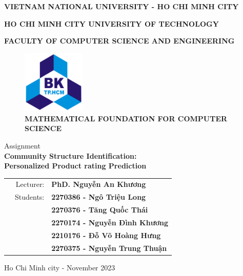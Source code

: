 \begin{titlepage}
\centerline{\bf \normalsize VIETNAM NATIONAL UNIVERSITY - HO CHI MINH CITY}
\centerline{\bf \normalsize HO CHI MINH CITY UNIVERSITY OF TECHNOLOGY}
\centerline{\bf \normalsize FACULTY OF COMPUTER SCIENCE AND ENGINEERING}
\vspace*{1cm}
\begin{figure}[h!]
	\begin{center}
		\includegraphics[width=3cm]{image/bku.png}
		\\
		\vspace{.5cm}
		\LARGE \textbf{MATHEMATICAL FOUNDATION FOR COMPUTER SCIENCE}
	\end{center}
\end{figure}

\begin{center}
    \Large Assignment
    \\
    \LARGE \textbf{Community Structure Identification:\\Personalized Product rating Prediction} \\
\end{center}

\vspace{3em}

\begin{table}[h]
\begin{tabular}{rrl}
\hspace{2.5 cm} & Lecturer: & \bf PhD. Nguyễn An Khương\\
& Students:  & \bf 2270386 - Ngô Triệu Long\\
& & \bf 2270376 - Tăng Quốc Thái\\
& & \bf 2270174 - Nguyễn Đình Khương\\
& & \bf 2210176 - Đỗ Võ Hoàng Hưng\\
& & \bf 2270375 - Nguyễn Trung Thuận\\
\end{tabular}
\end{table}

\vspace{2.5em}

\vfill
\begin{center}
	{\normalsize Ho Chi Minh city - November 2023}
\end{center}
\end{titlepage}


\newpage

\thispagestyle{empty}